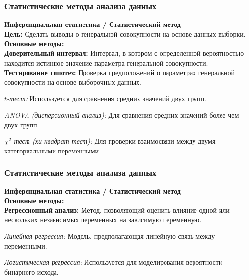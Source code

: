 \documentclass[aspectratio=169]{beamer}
\begin{document}
\begin{frame}
\frametitle{Статистические методы анализа данных}
\textbf{Инференциальная статистика / Статистический метод}
\newline\\
\textbf{Цель:} Сделать выводы о генеральной совокупности на основе данных выборки.
\newline\\
\textbf{Основные методы:}
\newline\\
\textbf{Доверительный интервал:} Интервал, в котором с определенной вероятностью находится истинное значение параметра генеральной совокупности.
\newline\\
\textbf{Тестирование гипотез:} Проверка предположений о параметрах генеральной совокупности на основе выборочных данных.

\quad\textit{$t$-тест:} Используется для сравнения средних значений двух групп.

\quad\textit{ANOVA (дисперсионный анализ):} Для сравнения средних значений более чем двух групп.

\quad\textit{$\chi^2$-тест (хи-квадрат тест):} Для проверки взаимосвязи между двумя категориальными переменными.
\end{frame}

\begin{frame}
\frametitle{Статистические методы анализа данных}
\textbf{Инференциальная статистика / Статистический метод}
\newline\\
\textbf{Основные методы:}
\newline\\
\textbf{Регрессионный анализ:} Метод, позволяющий оценить влияние одной или нескольких независимых переменных на зависимую переменную.

\quad\textit{Линейная регрессия:} Модель, предполагающая линейную связь между переменными.

\quad\textit{Логистическая регрессия:} Используется для моделирования вероятности бинарного исхода.

\end{frame}
\end{document}
